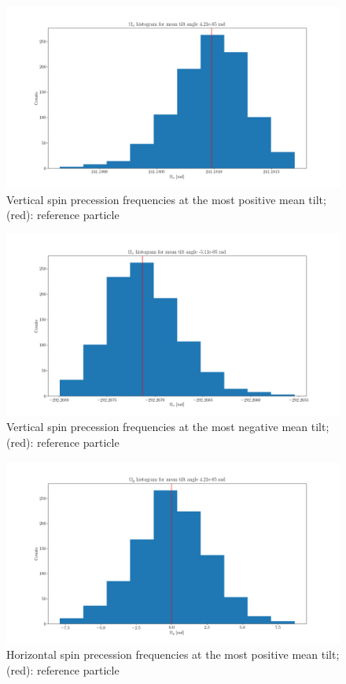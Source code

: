 \documentclass[pdf]{beamer}
\begin{document}
	\begin{frame}
		\begin{figure}
			\includegraphics[scale=.3]{Wx_dK_hist_most_positive_mean_tilt}
			\caption{Vertical spin precession frequencies at the most positive mean tilt; (red): reference particle}
		\end{figure}
	\end{frame}
	\begin{frame}
		\begin{figure}
			\includegraphics[scale=.3]{Wx_dK_hist_most_negative_mean_tilt}
			\caption{Vertical spin precession frequencies at the most negative mean tilt; (red): reference particle}
		\end{figure}
	\end{frame}
	\begin{frame}
		\begin{figure}
			\includegraphics[scale=.3]{Wy_dK_hist_most_positive_mean_tilt}
			\caption{Horizontal spin precession frequencies at the most positive mean tilt; (red): reference particle}
		\end{figure}
	\end{frame}
\end{document}
